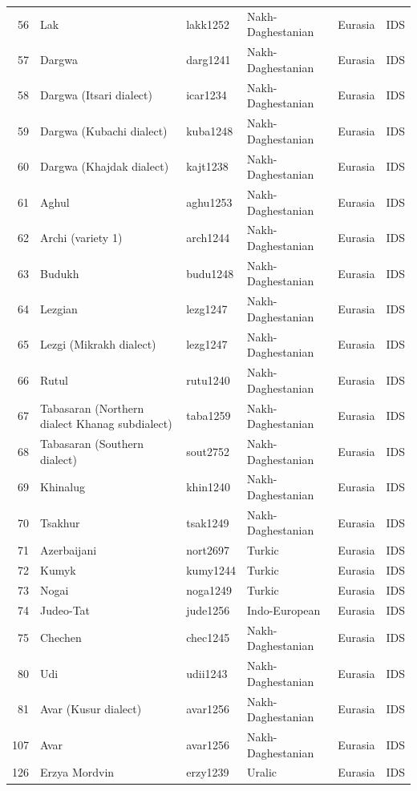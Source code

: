 \begin{table}[ht]
\begin{tabular}{rlllll}
  56 & Lak & lakk1252 & Nakh-Daghestanian & Eurasia & IDS \\ 
  57 & Dargwa & darg1241 & Nakh-Daghestanian & Eurasia & IDS \\ 
  58 & Dargwa (Itsari dialect) & icar1234 & Nakh-Daghestanian & Eurasia & IDS \\ 
  59 & Dargwa (Kubachi dialect) & kuba1248 & Nakh-Daghestanian & Eurasia & IDS \\ 
  60 & Dargwa (Khajdak dialect) & kajt1238 & Nakh-Daghestanian & Eurasia & IDS \\ 
  61 & Aghul & aghu1253 & Nakh-Daghestanian & Eurasia & IDS \\ 
  62 & Archi (variety 1) & arch1244 & Nakh-Daghestanian & Eurasia & IDS \\ 
  63 & Budukh & budu1248 & Nakh-Daghestanian & Eurasia & IDS \\ 
  64 & Lezgian & lezg1247 & Nakh-Daghestanian & Eurasia & IDS \\ 
  65 & Lezgi (Mikrakh dialect) & lezg1247 & Nakh-Daghestanian & Eurasia & IDS \\ 
  66 & Rutul & rutu1240 & Nakh-Daghestanian & Eurasia & IDS \\ 
  67 & Tabasaran (Northern dialect Khanag subdialect) & taba1259 & Nakh-Daghestanian & Eurasia & IDS \\ 
  68 & Tabasaran (Southern dialect) & sout2752 & Nakh-Daghestanian & Eurasia & IDS \\ 
  69 & Khinalug & khin1240 & Nakh-Daghestanian & Eurasia & IDS \\ 
  70 & Tsakhur & tsak1249 & Nakh-Daghestanian & Eurasia & IDS \\ 
  71 & Azerbaijani & nort2697 & Turkic & Eurasia & IDS \\ 
  72 & Kumyk & kumy1244 & Turkic & Eurasia & IDS \\ 
  73 & Nogai & noga1249 & Turkic & Eurasia & IDS \\ 
  74 & Judeo-Tat & jude1256 & Indo-European & Eurasia & IDS \\ 
  75 & Chechen & chec1245 & Nakh-Daghestanian & Eurasia & IDS \\ 
  80 & Udi & udii1243 & Nakh-Daghestanian & Eurasia & IDS \\ 
  81 & Avar (Kusur dialect) & avar1256 & Nakh-Daghestanian & Eurasia & IDS \\ 
  107 & Avar & avar1256 & Nakh-Daghestanian & Eurasia & IDS \\ 
  126 & Erzya Mordvin & erzy1239 & Uralic & Eurasia & IDS \\ 

\end{tabular}
\end{table}
